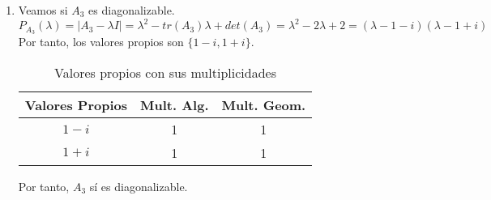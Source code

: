\begin{ejercicio}
\begin{enumerate}
        \item Veamos si $A_3$ es diagonalizable.
        \begin{equation*}
            P_{A_3}(\lambda) = |A_3-\lambda I| = \lambda^2 - tr(A_3)\lambda + det(A_3) = \lambda^2 -2\lambda  +2 = (\lambda-1-i)(\lambda-1+i)
        \end{equation*}
        Por tanto, los valores propios son $\{1-i,1+i\}$.
           \begin{table}[H]
                \centering
                \begin{tabular}{c|c|c}
                    Valores Propios & Mult. Alg. & Mult. Geom. \\ \hline 
                    $1-i$ & 1 & 1\\
                    $1+i$ & 1 & 1\\
                \end{tabular}
                \caption{Valores propios con sus multiplicidades}
            \end{table}
            Por tanto, $A_3$ sí es diagonalizable.
    \end{enumerate}
\end{ejercicio}


